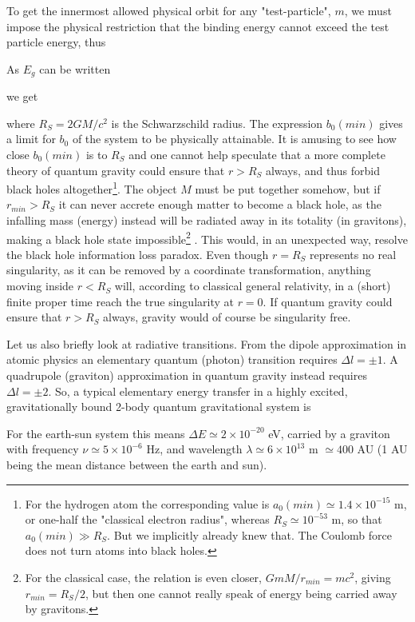 	To get the innermost allowed physical orbit for any
	"test-particle", $m$, we must impose the physical restriction
	that the binding energy cannot exceed the test particle energy,
	thus
	
	As $E_g$ can be written
	
	we get
	
	where $R_S = 2GM/c^2$ is the Schwarzschild radius. The expression
	$b_0 (min)$ gives a limit for $b_0$ of the system to be physically
	attainable. It is amusing to see how close $b_0 (min)$ is to $R_S$
	and one cannot help speculate that a more complete theory of
	quantum gravity could ensure that $r
	> R_S$ always, and thus forbid black holes altogether\footnote{For the
	hydrogen atom the corresponding value is $a_0 (min) \simeq 1.4
	\times 10^{-15}$ m, or one-half the "classical electron radius",
	whereas $R_S \simeq 10^{-53}$ m, so that $a_0 (min) \gg R_S$. But
	we implicitly already knew that. The Coulomb force does not turn
	atoms into black holes.}. The object $M$ must be put together
	somehow, but if $r_{min}
	> R_S$ it can never accrete enough matter to become a black hole,
	as the infalling mass (energy) instead will be radiated away in
	its totality (in gravitons), making a black hole state
	impossible\footnote{For the classical case, the relation is even
	closer, $GmM/r_{min} = mc^2$, giving $r_{min} = R_S /2$, but then
	one cannot really speak of energy being carried away by
	gravitons.} \cite{Hansson}. This would, in an unexpected way,
	resolve the black hole information loss paradox. Even though
	$r=R_S$ represents no real singularity, as it can be removed by a
	coordinate transformation, anything moving inside $r < R_S$ will,
	according to classical general relativity, in a (short) finite
	proper time reach the true singularity at $r=0$. If quantum
	gravity could ensure that $r > R_S$ always, gravity would of
	course be singularity free.
	
	Let us also briefly look at radiative transitions. From the dipole
	approximation in atomic physics an elementary quantum (photon)
	transition requires $\Delta l = \pm 1$. A quadrupole (graviton)
	approximation in quantum gravity instead requires $\Delta l = \pm
	2$. So, a typical elementary energy transfer in a highly excited,
	gravitationally bound 2-body quantum gravitational system is
	
	For the earth-sun system this means $\Delta E \simeq 2 \times
	10^{-20}$ eV, carried by a graviton with frequency $\nu \simeq 5
	\times 10^{-6}$ Hz, and wavelength $\lambda \simeq 6 \times
	10^{13}$ m $\simeq 400$ AU (1 AU being the mean distance between
	the earth and sun).
	
